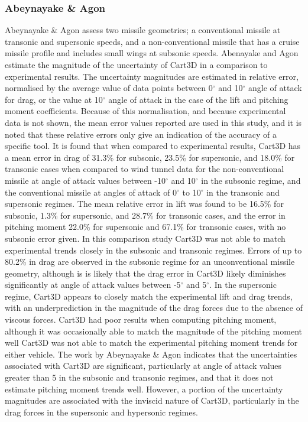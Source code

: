 \subsubsection{Abeynayake \& Agon}
Abeynayake \& Agon assess two missile geometries; a conventional missile at transonic and supersonic speeds, and a non-conventional missile that has a cruise missile profile and includes small wings at subsonic speeds\cite{Abeynayake2013a}. Abenayake and Agon estimate the magnitude of the uncertainty of Cart3D in a comparison to experimental results. The uncertainty magnitudes are estimated in relative error, normalised by the average value of data points between 0$^\circ$ and 10$^\circ$ angle of attack for drag, or the value at 10$^\circ$ angle of attack in the case of the lift and pitching moment coefficients\cite{Abeynayake2013a}. Because of this normalisation, and because experimental data is not shown\cite{Abeynayake2013a}, the mean error values reported are used in this study, and it is noted that these relative errors only give an indication of the accuracy of a specific tool\cite{Abeynayake2013a}. It is found that when compared to experimental results, Cart3D has a mean error in drag of 31.3\% for subsonic, 23.5\% for supersonic, and 18.0\% for transonic cases\cite{Abeynayake2013a} when compared to wind tunnel data for the non-conventional missile at angle of attack values between -10$^\circ$ and 10$^\circ$ in the subsonic regime, and the conventional missile at angles of attack of 0$^\circ$ to 10$^\circ$ in the transonic and supersonic regimes. The mean relative error in lift was found to be 16.5\% for subsonic, 1.3\% for supersonic, and 28.7\% for transonic cases\cite{Abeynayake2013a}, and the error in pitching moment 22.0\% for supersonic and 67.1\% for transonic cases, with no subsonic error given\cite{Abeynayake2013a}.
In this comparison study Cart3D was not able to match experimental trends closely in the subsonic and transonic regimes. Errors of up to 80.2\% in drag are observed in the subsonic regime for an unconventional missile geometry\cite{Abeynayake2013a}, although is is likely that the drag error in Cart3D likely diminishes significantly at angle of attack values between -5$^\circ$ and 5$^\circ$. In the supersonic regime, Cart3D appears to closely match the experimental lift and drag trends, with an underprediction in the magnitude of the drag forces due to the absence of viscous forces. 
Cart3D had poor results when computing pitching moment, although it was occasionally able to match the magnitude of the pitching moment well Cart3D was not able to match the experimental pitching moment trends for either vehicle\cite{Abeynayake2013a}. The work by Abeynayake \& Agon indicates that the uncertainties associated with Cart3D are significant, particularly at angle of attack values greater than 5 in the subsonic and transonic regimes, and that it does not estimate pitching moment trends well. However, a portion of the uncertainty magnitudes are associated with the inviscid nature of Cart3D, particularly in the drag forces in the supersonic and hypersonic regimes.

